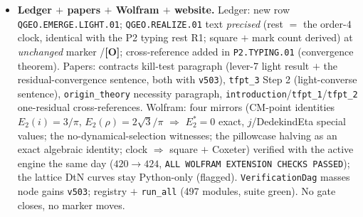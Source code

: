 \documentclass[11pt]{article}
\providecommand{\mO}{\textbf{[O]}}\providecommand{\mX}{\textbf{[X]}}
\begin{document}
\begin{itemize}[leftmargin=1.5em]
analogue): B-rigidity in the sharpened form ``RP seam data $\Rightarrow$ order-$4$ clock'' is the
live route. \texttt{v215} lever 7 thereby moves from ``deferred, not executable'' to ``light version
executed: rigidity, not dynamical selection'' --- documented in \texttt{v503}, \texttt{v215} itself
unchanged.
\item \textbf{Ledger $+$ papers $+$ Wolfram $+$ website.} Ledger: new row
\texttt{QGEO.EMERGE.LIGHT.01}; \texttt{QGEO.REALIZE.01} text \emph{precised} (rest $=$ the order-$4$
clock, identical with the P2 typing rest R1; square $+$ mark count derived) at \emph{unchanged}
marker \mC/\mO; cross-reference added in \texttt{P2.TYPING.01} (convergence theorem). Papers:
contracts kill-test paragraph (lever-7 light result $+$ the residual-convergence sentence, both with
\texttt{v503}), \texttt{tfpt\_3} Step 2 (light-converse sentence), \texttt{origin\_theory}
necessity paragraph, \texttt{introduction}/\texttt{tfpt\_1}/\texttt{tfpt\_2} one-residual
cross-references. Wolfram: four mirrors (CM-point identities $E_2(i)=3/\pi$, $E_2(\rho)=2\sqrt3/\pi$
$\Rightarrow$ $E_2^*=0$ exact, $j$/DedekindEta special values; the no-dynamical-selection witnesses;
the pillowcase halving as an exact algebraic identity; clock $\Rightarrow$ square $+$ Coxeter)
verified with the active engine the same day ($420\to424$, \texttt{ALL WOLFRAM EXTENSION CHECKS
PASSED}); the lattice DtN curves stay Python-only (flagged). \texttt{VerificationDag} masses node
gains \texttt{v503}; registry $+$ \texttt{run\_all} (497 modules, suite green). No gate closes, no
marker moves.
\end{itemize}
\end{document}
